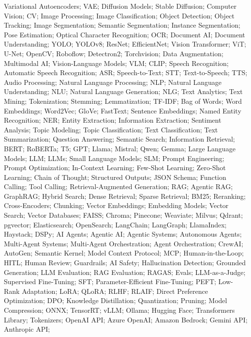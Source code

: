 {  Variational Autoencoders; VAE; Diffusion Models; Stable Diffusion;
  Computer Vision; CV; Image Processing; Image Classification;
  Object Detection; Object Tracking; Image Segmentation;
  Semantic Segmentation; Instance Segmentation; Pose Estimation;
  Optical Character Recognition; OCR; Document AI; Document Understanding;
  YOLO; YOLOv8; ResNet; EfficientNet; Vision Transformer; ViT; U-Net;
  OpenCV; Roboflow; Detectron2; Torchvision; Data Augmentation;
  Multimodal AI; Vision-Language Models; VLM; CLIP;
  Speech Recognition; Automatic Speech Recognition; ASR;
  Speech-to-Text; STT; Text-to-Speech; TTS; Audio Processing;
  Natural Language Processing; NLP; Natural Language Understanding; NLU;
  Natural Language Generation; NLG; Text Analytics; Text Mining;
  Tokenization; Stemming; Lemmatization; TF-IDF; Bag of Words;
  Word Embeddings; Word2Vec; GloVe; FastText; Sentence Embeddings;
  Named Entity Recognition; NER; Entity Extraction; Information Extraction;
  Sentiment Analysis; Topic Modeling; Topic Classification; Text Classification;
  Text Summarization; Question Answering; Semantic Search; Information Retrieval;
  BERT; RoBERTa; T5; GPT; Llama; Mistral; Qwen; Gemma;
  Large Language Models; LLM; LLMs; Small Language Models; SLM;
  Prompt Engineering; Prompt Optimization; In-Context Learning;
  Few-Shot Learning; Zero-Shot Learning; Chain of Thought;
  Structured Outputs; JSON Schema; Function Calling; Tool Calling;
  Retrieval-Augmented Generation; RAG; Agentic RAG; GraphRAG;
  Hybrid Search; Dense Retrieval; Sparse Retrieval; BM25; Reranking;
  Cross-Encoders; Chunking; Vector Embeddings; Embedding Models;
  Vector Search; Vector Databases; FAISS; Chroma; Pinecone;
  Weaviate; Milvus; Qdrant; pgvector; Elasticsearch; OpenSearch;
  LangChain; LangGraph; LlamaIndex; Haystack; DSPy;
  AI Agents; Agentic AI; Agentic Systems; Autonomous Agents;
  Multi-Agent Systems; Multi-Agent Orchestration; Agent Orchestration;
  CrewAI; AutoGen; Semantic Kernel; Model Context Protocol; MCP;
  Human-in-the-Loop; HITL; Human Review; Guardrails; AI Safety;
  Hallucination Detection; Grounded Generation; LLM Evaluation;
  RAG Evaluation; RAGAS; Evals; LLM-as-a-Judge;
  Supervised Fine-Tuning; SFT; Parameter-Efficient Fine-Tuning; PEFT;
  Low-Rank Adaptation; LoRA; QLoRA; RLHF; RLAIF;
  Direct Preference Optimization; DPO; Knowledge Distillation;
  Quantization; Pruning; Model Compression; ONNX; TensorRT;
  vLLM; Ollama; Hugging Face; Transformers Library; Tokenizers;
  OpenAI API; Azure OpenAI; Amazon Bedrock; Gemini API; Anthropic API;
}

